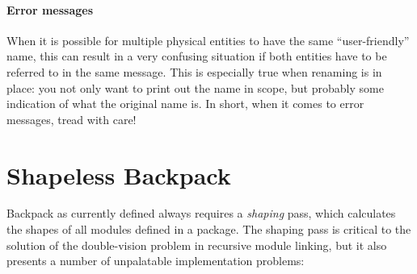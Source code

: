 \documentclass{article}
\begin{document}
\paragraph{Error messages}  When it is possible for multiple physical
entities to have the same ``user-friendly'' name, this can result in a
very confusing situation if both entities have to be referred to in the
same message.  This is especially true when renaming is in place:
you not only want to print out the name in scope, but probably some indication
of what the original name is.  In short, when it comes to error messages, tread with care!

\section{Shapeless Backpack}\label{sec:simplifying-backpack}

Backpack as currently defined always requires a \emph{shaping} pass,
which calculates the shapes of all modules defined in a package.
The shaping pass is critical to the solution of the double-vision problem
in recursive module linking, but it also presents a number of unpalatable
implementation problems:
\end{document}
